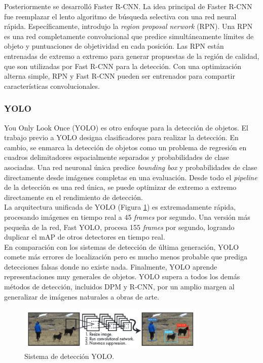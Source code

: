 \documentclass{bmvc2k}
\begin{document}
Posteriormente se desarrolló Faster R-CNN. La idea principal de Faster R-CNN fue reemplazar el lento algoritmo de búsqueda selectiva con una red neural rápida. Específicamente, introdujo la \textit{region proposal nerwork} (RPN). Una RPN es una
red completamente convolucional que predice simultáneamente límites de objeto y puntuaciones de objetividad en cada posición. Las RPN están entrenadas de extremo a extremo para generar propuestas de la región de calidad, que son utilizadas por Fast R-CNN para la detección. Con una optimización alterna simple, RPN y Fast R-CNN pueden ser entrenados para compartir características convolucionales.\\


\subsubsection{YOLO}

You Only Look Once (YOLO) es otro enfoque para la detección de objetos. El trabajo previo a YOLO designa clasificadores para realizar la detección. En cambio, se enmarca la detección de objetos como un problema de regresión en cuadros delimitadores espacialmente separados y probabilidades de clase asociadas. Una red neuronal única predice \textit{bounding box} y probabilidades de clase directamente desde imágenes completas en una evaluación. Desde todo el \textit{pipeline} de la detección es una red única, se puede optimizar de extremo a extremo directamente en el rendimiento de detección.\\

La arquitectura unificada de YOLO (Figura \ref{fig.yolo}) es extremadamente rápida, procesando imágenes en tiempo real a 45 \textit{frames} por segundo. Una versión más pequeña de la red, Fast YOLO, procesa 155 \textit{frames} por segundo, logrando duplicar el mAP de otros detectores en tiempo real.\\

En comparación con los sistemas de detección de última generación, YOLO comete más errores de localización pero es mucho menos probable que prediga detecciones falsas donde no existe nada. Finalmente, YOLO aprende representaciones muy generales de objetos. YOLO supera a todos los demás métodos de detección, incluidos DPM y R-CNN, por un amplio margen al generalizar de imágenes naturales a obras de arte.\\

\begin{figure}
\begin{center}
	\includegraphics[width=0.8\textwidth]{images/yolo.png}
   \caption{Sistema de detección YOLO.}
	\label{fig.yolo}
\end{center}
\end{figure}
\end{document}
